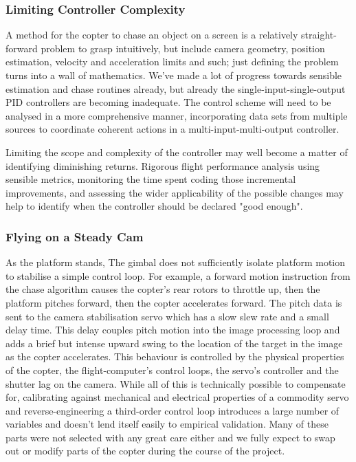 \documentclass[a4paper, 11pt, titlepage]{article}
\begin{document}
    \subsubsection{Limiting Controller Complexity}
      A method for the copter to chase an object on a screen is a relatively straight-forward problem to grasp intuitively, but include camera geometry, position estimation, velocity and acceleration limits and such; just defining the problem turns into a wall of mathematics.  We've made a lot of progress towards sensible estimation and chase routines already, but already the single-input-single-output PID controllers are becoming inadequate. The control scheme will need to be analysed in a more comprehensive manner, incorporating data sets from multiple sources to coordinate coherent actions in a multi-input-multi-output controller.

      Limiting the scope and complexity of the controller may well become a matter of identifying diminishing returns.  Rigorous flight performance analysis using sensible metrics, monitoring the time spent coding those incremental improvements, and assessing the wider applicability of the possible changes may help to identify when the controller should be declared "good enough".


    \subsubsection{Flying on a Steady Cam}
    \label{sec:Camera Stability}
      As the platform stands, The gimbal does not sufficiently isolate platform motion to stabilise a simple control loop.
      For example, a forward motion instruction from the chase algorithm causes the copter's rear rotors to throttle up, then the platform pitches forward, then the copter accelerates forward.  The pitch data is sent to the camera stabilisation servo which has a slow slew rate and a small delay time.  This delay couples pitch motion into the image processing loop and adds a brief but intense upward swing to the location of the target in the image as the copter accelerates.
      This behaviour is controlled by the physical properties of the copter, the flight-computer's control loops, the servo's controller and the shutter lag on the camera. While all of this is technically possible to compensate for, calibrating against mechanical and electrical properties of a commodity servo and reverse-engineering a third-order control loop introduces a large number of variables and doesn't lend itself easily to empirical validation.  Many of these parts were not selected with any great care either and we fully expect to swap out or modify parts of the copter during the course of the project.
\end{document}
